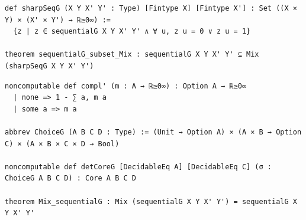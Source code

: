 \label{lean:sequentialg-subset-mix}
\begin{lstlisting}
def sharpSeqG (X Y X' Y' : Type) [Fintype X] [Fintype X'] : Set ((X × Y) × (X' × Y') → ℝ≥0∞) :=
  {z | z ∈ sequentialG X Y X' Y' ∧ ∀ u, z u = 0 ∨ z u = 1}

theorem sequentialG_subset_Mix : sequentialG X Y X' Y' ⊆ Mix (sharpSeqG X Y X' Y')
\end{lstlisting}

\label{lean:mix-sequentialg}
\begin{lstlisting}
noncomputable def compl' (m : A → ℝ≥0∞) : Option A → ℝ≥0∞
  | none => 1 - ∑ a, m a
  | some a => m a

abbrev ChoiceG (A B C D : Type) := (Unit → Option A) × (A × B → Option C) × (A × B × C × D → Bool)

noncomputable def detCoreG [DecidableEq A] [DecidableEq C] (σ : ChoiceG A B C D) : Core A B C D

theorem Mix_sequentialG : Mix (sequentialG X Y X' Y') = sequentialG X Y X' Y'
\end{lstlisting}

